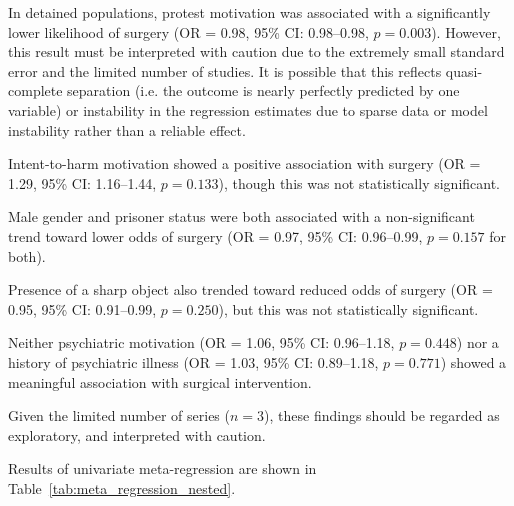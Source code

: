 In detained populations, protest motivation was associated with a significantly lower likelihood of surgery (OR = 0.98, 95\% CI: 0.98--0.98, $p = 0.003$). However, this result must be interpreted with caution due to the extremely small standard error and the limited number of studies. It is possible that this reflects quasi-complete separation (i.e. the outcome is nearly perfectly predicted by one variable) or instability in the regression estimates due to sparse data or model instability rather than a reliable effect.

Intent-to-harm motivation showed a positive association with surgery (OR = 1.29, 95\% CI: 1.16--1.44, $p = 0.133$), though this was not statistically significant.

Male gender and prisoner status were both associated with a non-significant trend toward lower odds of surgery (OR = 0.97, 95\% CI: 0.96--0.99, $p = 0.157$ for both).

Presence of a sharp object also trended toward reduced odds of surgery (OR = 0.95, 95\% CI: 0.91--0.99, $p = 0.250$), but this was not statistically significant. 

Neither psychiatric motivation (OR = 1.06, 95\% CI: 0.96--1.18, $p = 0.448$) nor a history of psychiatric illness (OR = 1.03, 95\% CI: 0.89--1.18, $p = 0.771$) showed a meaningful association with surgical intervention.

Given the limited number of series ($n = 3$), these findings should be regarded as exploratory, and interpreted with caution.

Results of univariate meta-regression are shown in Table~\ref{tab:meta_regression_nested}.


